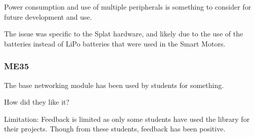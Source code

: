 Power consumption and use of multiple peripherals is something to consider for future development and use. 

The issue was specific to the Splat hardware, and likely due to the use of the batteries instead of LiPo batteries that were used in the Smart Motors. 

\subsubsection{\label{sec:res_me35}ME35}

The base networking module has been used by students for something.

How did they like it?

Limitation: Feedback is limited as only some students have used the library for their projects. Though from these students, feedback has been positive.